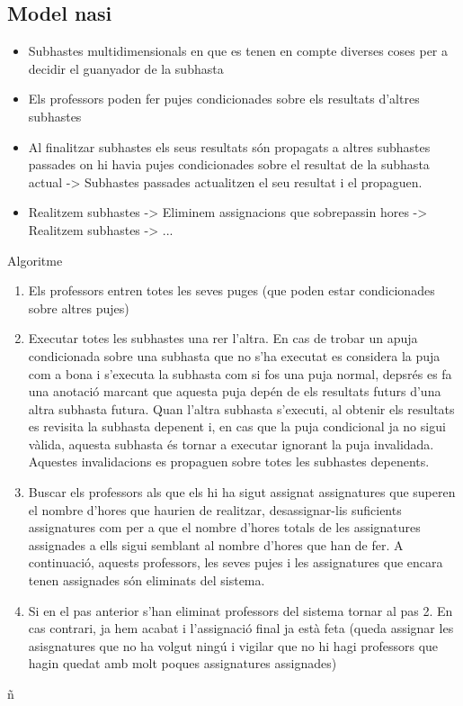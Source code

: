 \documentclass[10pt,twocolumn]{article}
\begin{document}
\subsection{Model nasi}
\begin{itemize}
	\item Subhastes multidimensionals en que es tenen en compte diverses coses per a decidir el guanyador de la subhasta
	\item Els professors poden fer pujes condicionades sobre els resultats d'altres subhastes
	\item Al finalitzar subhastes els seus resultats són propagats a altres subhastes passades on hi havia pujes condicionades sobre el resultat de la subhasta actual -> Subhastes passades actualitzen el seu resultat i el propaguen.
	\item Realitzem subhastes -> Eliminem assignacions que sobrepassin hores -> Realitzem subhastes -> ...
\end{itemize}

Algoritme
\begin{enumerate}
	\item Els professors entren totes les seves puges (que poden estar condicionades sobre altres pujes)
	\item Executar totes les subhastes una rer l'altra. En cas de trobar un apuja condicionada sobre una subhasta que no s'ha executat es considera la puja com a bona i s'executa la subhasta com si fos una puja normal, depsrés es fa una anotació marcant que aquesta puja depén de els resultats futurs d'una altra subhasta futura. Quan l'altra subhasta s'executi, al obtenir els resultats es revisita la subhasta depenent i, en cas que la puja condicional ja no sigui vàlida, aquesta subhasta és tornar a executar ignorant la puja invalidada. Aquestes invalidacions es propaguen sobre totes les subhastes depenents.
	\item Buscar els professors als que els hi ha sigut assignat assignatures que superen el nombre d'hores que haurien de realitzar, desassignar-lis suficients assignatures com per a que el nombre d'hores totals de les assignatures assignades a ells sigui semblant al nombre d'hores que han de fer. A continuació, aquests professors, les seves pujes i les assignatures que encara tenen assignades són eliminats del sistema.
	\item Si en el pas anterior s'han eliminat professors del sistema tornar al pas 2. En cas contrari, ja hem acabat i l'assignació final ja està feta (queda assignar les asisgnatures que no ha volgut ningú i vigilar que no hi hagi professors que hagin quedat amb molt poques assignatures assignades)
\end{enumerate}
ñ
\\
\newpage
\end{document}

